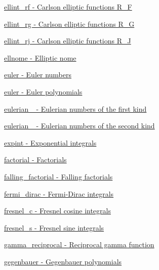 \begin{DoxyItemize}
\item \hyperlink{group__gnu__math__spec__func_gae4859494464c7eaf98193f92b2235bc1}{ellint\+\_\+rf -\/ Carlson elliptic functions R\+\_\+F}
\item \hyperlink{group__gnu__math__spec__func_gadf618529d6106c1c1bc1e9212c4fed12}{ellint\+\_\+rg -\/ Carlson elliptic functions R\+\_\+G}
\item \hyperlink{group__gnu__math__spec__func_gadccabc8df929cc03745286ed1574a3ba}{ellint\+\_\+rj -\/ Carlson elliptic functions R\+\_\+J}
\item \hyperlink{group__gnu__math__spec__func_ga7bfb34f8b5c0ed7c72040f9cb7034bba}{ellnome -\/ Elliptic nome}
\item \hyperlink{group__gnu__math__spec__func_gac956e6457ab7d0d1765d281e73073f55}{euler -\/ Euler numbers}
\item \hyperlink{group__gnu__math__spec__func_gac956e6457ab7d0d1765d281e73073f55}{euler -\/ Euler polynomials}
\item \hyperlink{group__gnu__math__spec__func_gadfd8810a97655d2cdd1b0e3af68a79d3}{eulerian\+\_ -\/ Eulerian numbers of the first kind}
\item \hyperlink{group__gnu__math__spec__func_ga9bc456941d5e35cf54ec9c50f2e52884}{eulerian\+\_ -\/ Eulerian numbers of the second kind}
\item \hyperlink{group__gnu__math__spec__func_gadaf9317953b826975da72d1858f01ea5}{expint -\/ Exponential integrals}
\item \hyperlink{group__gnu__math__spec__func_ga963b1612f50b0964f5f42c9f289aab68}{factorial -\/ Factorials}
\item \hyperlink{group__gnu__math__spec__func_ga3cc8eb6068c7155ec48b40e20160c5c0}{falling\+\_\+factorial -\/ Falling factorials}
\item \hyperlink{group__gnu__math__spec__func_ga5468fbaed5cb8384cff7cfb9d2188d1a}{fermi\+\_\+dirac -\/ Fermi-\/\+Dirac integrals}
\item \hyperlink{group__gnu__math__spec__func_ga92a3585165bfad3f9972fb4210140d22}{fresnel\+\_\+c -\/ Fresnel cosine integrals}
\item \hyperlink{group__gnu__math__spec__func_ga075a32b4f59a5fa67c2e28232c89ad45}{fresnel\+\_\+s -\/ Fresnel sine integrals}
\item \hyperlink{group__gnu__math__spec__func_ga641f9bcdb8fc32a9a0ce7a15b5040076}{gamma\+\_\+reciprocal -\/ Reciprocal gamma function}
\item \hyperlink{group__gnu__math__spec__func_ga173ae710f76407f5997a4caa5c3c060e}{gegenbauer -\/ Gegenbauer polynomials}

\end{DoxyItemize}
